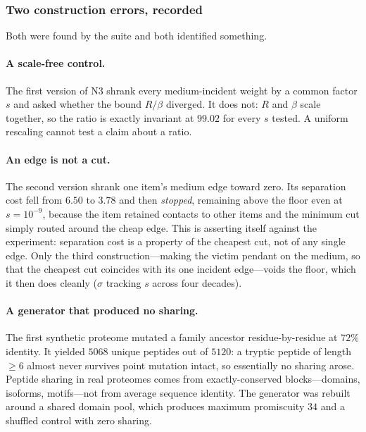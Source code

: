 \documentclass[11pt,a4paper]{article}
\theoremstyle{definition}
\theoremstyle{remark}
\newcommand{\flo}{\beta}                     %
\newcommand{\sep}{\sigma}                    %
\newcommand{\resid}{R}                       %
\begin{document}
\subsubsection{Two construction errors, recorded}

Both were found by the suite and both identified something.

\paragraph{A scale-free control.} The first version of N3 shrank every
medium-incident weight by a common factor $s$ and asked whether the
bound $\resid/\flo$ diverged. It does not: $\resid$ and $\flo$ scale
together, so the ratio is exactly invariant at $99.02$ for every $s$
tested. A uniform rescaling cannot test a claim about a ratio.

\paragraph{An edge is not a cut.} The second version shrank one item's
medium edge toward zero. Its separation cost fell from $6.50$ to $3.78$
and then \emph{stopped}, remaining above the floor even at
$s=10^{-9}$, because the item retained contacts to other items and the
minimum cut simply routed around the cheap edge. This is
 asserting itself against the experiment: separation
cost is a property of the cheapest cut, not of any single edge. Only
the third construction---making the victim pendant on the medium, so
that the cheapest cut coincides with its one incident edge---voids the
floor, which it then does cleanly ($\sep$ tracking $s$ across four
decades).

\paragraph{A generator that produced no sharing.} The first synthetic
proteome mutated a family ancestor residue-by-residue at $72\%$
identity. It yielded $5068$ unique peptides out of $5120$: a tryptic
peptide of length $\ge6$ almost never survives point mutation intact, so
essentially no sharing arose. Peptide sharing in real proteomes comes
from exactly-conserved blocks---domains, isoforms, motifs---not from
average sequence identity. The generator was rebuilt around a shared
domain pool, which produces maximum promiscuity $34$ and a shuffled
control with zero sharing.

\end{document}
